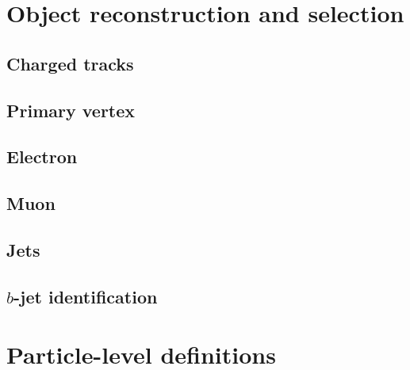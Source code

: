 \section{Object reconstruction and selection}
\subsection{Charged tracks}
\subsection{Primary vertex}
\subsection{Electron}
\subsection{Muon}
\subsection{Jets}
\subsection{$b$-jet identification}
\section{Particle-level definitions}
